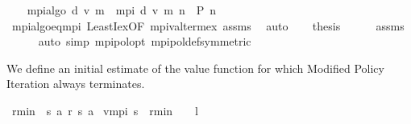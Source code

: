 \begin{isabellebody}
\ \ \isamarkupfalse%
\ {\isachardoublequoteopen}mpi{\isacharunderscore}{\kern0pt}algo\ d\ v{}\ m\ {\isacharequal}{\kern0pt}\ mpi\ d\ v{}\ m\ {\isacharquery}{\kern0pt}n{\isachardoublequoteclose}\ \ {\isachardoublequoteopen}{\isacharquery}{\kern0pt}P\ {\isacharquery}{\kern0pt}n{\isachardoublequoteclose}\isanewline
\ \ \ \ \isamarkupfalse%
\ mpi{\isacharunderscore}{\kern0pt}algo{\isacharunderscore}{\kern0pt}eq{\isacharunderscore}{\kern0pt}mpi\ LeastI{\isacharunderscore}{\kern0pt}ex{\isacharbrackleft}{\kern0pt}OF\ mpi{\isacharunderscore}{\kern0pt}val{\isacharunderscore}{\kern0pt}term{\isacharunderscore}{\kern0pt}ex{\isacharbrackright}{\kern0pt}\ assms\ \isamarkupfalse%
\ auto\isanewline
\ \ \isamarkupfalse%
\ {\isacharquery}{\kern0pt}thesis\isanewline
\ \ \ \ \isamarkupfalse%
\ assms\isanewline
\ \ \ \ \isamarkupfalse%
\ {\isacharparenleft}{\kern0pt}auto\ simp{\isacharcolon}{\kern0pt}\ mpi{\isacharunderscore}{\kern0pt}pol{\isacharunderscore}{\kern0pt}opt\ mpi{\isacharunderscore}{\kern0pt}pol{\isacharunderscore}{\kern0pt}def{\isacharbrackleft}{\kern0pt}symmetric{\isacharbrackright}{\kern0pt}{\isacharparenright}{\kern0pt}\isanewline
{}\isamarkupfalse%
%
\endisatagproof
{\isafoldproof}%
%
\isadelimproof
\isanewline
%
\endisadelimproof
\isanewline
{}\isamarkupfalse%
%
\isadelimdocument
%
\endisadelimdocument
%
\isatagdocument
%
\isamarkuptrue%
%
\endisatagdocument
{\isafolddocument}%
%
\isadelimdocument
%
\endisadelimdocument
%
\begin{isamarkuptext}%
We define an initial estimate of the value function for which Modified Policy Iteration 
  always terminates.%
\end{isamarkuptext}\isamarkuptrue%
\isamarkupfalse%
\ {\isachardoublequoteopen}r{\isacharunderscore}{\kern0pt}min\ {\isasymequiv}\ {\isacharparenleft}{\kern0pt}{\isasymSqinter}s{\isacharprime}{\kern0pt}\ a{\isachardot}{\kern0pt}\ r\ {\isacharparenleft}{\kern0pt}s{\isacharprime}{\kern0pt}{\isacharcomma}{\kern0pt}\ a{\isacharparenright}{\kern0pt}{\isacharparenright}{\kern0pt}{\isachardoublequoteclose}\isanewline
{}\isamarkupfalse%
\ {\isachardoublequoteopen}v{}{\isacharunderscore}{\kern0pt}mpi\ s\ {\isacharequal}{\kern0pt}\ r{\isacharunderscore}{\kern0pt}min\ {\isacharslash}{\kern0pt}\ {\isacharparenleft}{\kern0pt}{}\ {\isacharminus}{\kern0pt}\ l{\isacharparenright}{\kern0pt}{\isachardoublequoteclose}\isanewline

\end{isabellebody}

